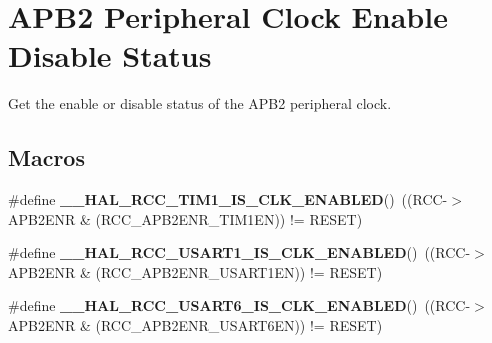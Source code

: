 \hypertarget{group___r_c_c___a_p_b2___peripheral___clock___enable___disable___status}{}\section{A\+P\+B2 Peripheral Clock Enable Disable Status}
\label{group___r_c_c___a_p_b2___peripheral___clock___enable___disable___status}


Get the enable or disable status of the A\+P\+B2 peripheral clock.  


\subsection*{Macros}
\begin{DoxyCompactItemize}
\item 
\mbox{\label{group___r_c_c___a_p_b2___peripheral___clock___enable___disable___status_gad2b7c3a381d791c4ee728e303935832a}} 
\#define {\bfseries \+\_\+\+\_\+\+H\+A\+L\+\_\+\+R\+C\+C\+\_\+\+T\+I\+M1\+\_\+\+I\+S\+\_\+\+C\+L\+K\+\_\+\+E\+N\+A\+B\+L\+ED}()~((R\+CC-\/$>$A\+P\+B2\+E\+NR \& (R\+C\+C\+\_\+\+A\+P\+B2\+E\+N\+R\+\_\+\+T\+I\+M1\+EN)) != R\+E\+S\+ET)
\item 
\mbox{\label{group___r_c_c___a_p_b2___peripheral___clock___enable___disable___status_ga59bd3cd20df76f885695fcdad1edce27}} 
\#define {\bfseries \+\_\+\+\_\+\+H\+A\+L\+\_\+\+R\+C\+C\+\_\+\+U\+S\+A\+R\+T1\+\_\+\+I\+S\+\_\+\+C\+L\+K\+\_\+\+E\+N\+A\+B\+L\+ED}()~((R\+CC-\/$>$A\+P\+B2\+E\+NR \& (R\+C\+C\+\_\+\+A\+P\+B2\+E\+N\+R\+\_\+\+U\+S\+A\+R\+T1\+EN)) != R\+E\+S\+ET)
\item 
\mbox{\label{group___r_c_c___a_p_b2___peripheral___clock___enable___disable___status_ga639ccb1e63662b309fc875bc608aa7e6}} 
\#define {\bfseries \+\_\+\+\_\+\+H\+A\+L\+\_\+\+R\+C\+C\+\_\+\+U\+S\+A\+R\+T6\+\_\+\+I\+S\+\_\+\+C\+L\+K\+\_\+\+E\+N\+A\+B\+L\+ED}()~((R\+CC-\/$>$A\+P\+B2\+E\+NR \& (R\+C\+C\+\_\+\+A\+P\+B2\+E\+N\+R\+\_\+\+U\+S\+A\+R\+T6\+EN)) != R\+E\+S\+ET)
\item 
\mbox{\label{group___r_c_c___a_p_b2___peripheral___clock___enable___disable___status_ga66eb89f7d856d9107e814efc751e8996}} 

\end{DoxyCompactItemize}
